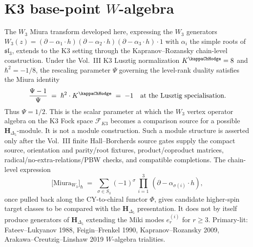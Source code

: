 \section{K3 base-point $W$-algebra}
\label{sec:w-algebras-w3-supplement}

\begin{remark}
\label{rem:w-algebras-w3-1}
The $W_3$ Miura transform developed here, expressing the $W_3$ generators
$W_3(z) = (\partial - \alpha_1\cdot h)(\partial - \alpha_2\cdot h)(\partial - \alpha_3\cdot h) \cdot 1$
with $\alpha_i$ the simple roots of $\mathfrak{sl}_3$, extends to the
K3 setting through the Kapranov--Rozansky chain-level construction.
Under the Vol.~III K3 Lusztig normalization
$K^{\kappaChHodge}=8$ and $\hbar^2=-1/8$, the rescaling
parameter $\Psi$ governing the level-rank duality satisfies the Miura
identity
\[
\frac{\Psi - 1}{\Psi} \;=\; \hbar^2\cdot K^{\kappaChHodge} \;=\; -1 \quad\text{at the Lusztig specialisation}.
\]
Thus $\Psi = 1/2$. This is the scalar parameter at which the
$W_3$ vertex operator algebra on the K3 Fock space $\mathcal F_{K3}$
becomes a comparison source for a possible
$\mathbf H_{\Delta_5}$-module. It is not a module construction. Such a
module structure is asserted only after the Vol.~III finite
Hall--Borcherds source gates supply the compact source, orientation and
parity/root fixtures, product/coproduct matrices,
radical/no-extra-relations/PBW checks, and compatible completions. The
chain-level
expression
\[
\bigl[\text{Miura}_{W_3}\bigr]_\hbar \;=\;
\sum_{\sigma\in S_3} (-1)^\sigma\,\prod_{i=1}^3\, (\partial - \alpha_{\sigma(i)}\cdot h),
\]
once pulled back along the CY-to-chiral functor $\Phi$, gives candidate
higher-spin target classes to be compared with the
$\mathbf H_{\Delta_5}$ presentation. It does not by itself produce
generators of $\mathbf H_{\Delta_5}$ extending the Miki modes
$e^{(i)}_r$ for $r\ge 3$. Primary-lit: Fateev--Lukyanov 1988,
Feigin--Frenkel 1990, Kapranov--Rozansky 2009, Arakawa--Creutzig--Linshaw
2019 $W$-algebra trialities.
\end{remark}

